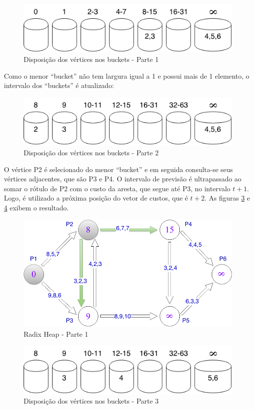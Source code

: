 \begin{figure}[htbp]
\centering
 \includegraphics[width=.50\textwidth]{chapters/fig/buckets1.png}
\caption{Disposição dos vértices nos buckets - Parte 1}
\label{fig:buckets1}
\end{figure}
\FloatBarrier

Como o menor ``bucket'' não tem largura igual a 1 e possui mais de 1 elemento, o intervalo dos ``buckets''
é atualizado:

\begin{figure}[htbp]
\centering
 \includegraphics[width=.50\textwidth]{chapters/fig/buckets2.png}
\caption{Disposição dos vértices nos buckets - Parte 2}
\label{fig:buckets2}
\end{figure}
\FloatBarrier

O vértice P2 é selecionado do menor ``bucket'' e em seguida consulta-se seus vértices adjacentes, que são P3 e P4.
O intervalo de previsão é ultrapassado ao somar o rótulo de P2 com o custo da aresta, que segue até P3, no intervalo $t + 1$. Logo, 
é utilizado a próxima posição do vetor de custos, que é $t + 2$. As figuras \ref{fig:limitesup1} e \ref{fig:buckets3} exibem o resultado.

\begin{figure}[htbp]
\centering
 \includegraphics[width=.50\textwidth]{chapters/fig/limitesup1.png}
\caption{Radix Heap - Parte 1}
\label{fig:limitesup1}
\end{figure}

\begin{figure}[htbp]
\centering
 \includegraphics[width=.50\textwidth]{chapters/fig/buckets3.png}
\caption{Disposição dos vértices nos buckets - Parte 3}
\label{fig:buckets3}
\end{figure}
\FloatBarrier

